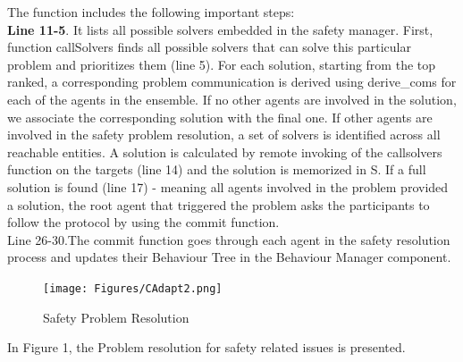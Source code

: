 \documentclass[journal]{IEEEtran}
\theoremstyle{definition}
\newcommand\darko[1]{\nb{Darko}{#1}}
\newcommand\patrizio[1]{\nb{Patrizio}{#1}}
\begin{document}
%				
The function includes the following important steps:\\
\textbf{Line 11-5}. It lists all possible solvers embedded in the safety manager. First, function callSolvers finds all possible solvers that can solve this particular problem and prioritizes them (line 5). 
For each solution, starting from the top ranked, a corresponding problem communication is derived using derive\_coms for each of the agents in the ensemble. If no other agents are involved in the solution, we associate the corresponding solution with the final one.
If other agents are involved in the safety problem resolution, 
a set of solvers is identified across all reachable entities. A solution is calculated by remote invoking of the
callsolvers function on the targets (line 14)
and the solution is memorized in S.
If a full solution is found (line 17) - meaning all agents involved in the problem provided a solution, the root agent that triggered the problem asks the participants to follow the protocol by using the commit function. \\ 
{Line 26-30.}The commit function goes through each agent in the safety resolution process and updates their Behaviour Tree in the Behaviour Manager component.



\darko{END}


\begin{figure}[h]
\texttt{[image: Figures/CAdapt2.png]}
\caption{Safety Problem Resolution\patrizio{unreadable}}
\end{figure}




In Figure 1, the Problem resolution for safety related issues is presented.
\end{document}

